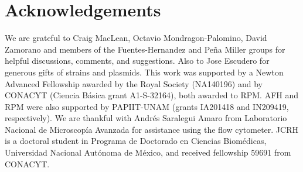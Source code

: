 \documentclass[fleqn,12pt]{wlscirep}
\newcommand\note[1]{\mbox{}\marginpar{\footnotesize\raggedright\hspace{0pt}\color{orange}\emph{#1}}}
\begin{document}
\section*{Acknowledgements}

We are grateful to Craig MacLean, Octavio Mondragon-Palomino, David Zamorano and members of the Fuentes-Hernandez and Pe\~na Miller groups for helpful discussions, comments, and suggestions. Also to Jose Escudero for generous gifts of strains and plasmids.
This work was supported by a Newton Advanced Fellowship awarded by the Royal Society (NA140196) and by CONACYT (Ciencia B\'asica grant A1-S-32164), both awarded to RPM. AFH and RPM were also supported by PAPIIT-UNAM (grants IA201418 and IN209419, respectively). We are thankful with Andr\'es Saralegui Amaro from Laboratorio Nacional de Microscop\'ia Avanzada for assistance using the flow cytometer. JCRH is a doctoral student in Programa de Doctorado en Ciencias Biom\'edicas, Universidad Nacional Aut\'onoma de M\'exico, and received fellowship 59691 from CONACYT. \note{Other funding?}

\small

\end{document}
